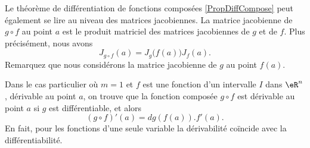 \begin{normaltext}      \label{NORMooKBJVooDDDmOa}
	Le théorème de différentiation de fonctions composées \ref{PropDiffCompose} peut également se lire au niveau des matrices jacobiennes. La matrice jacobienne de \( g\circ f\) au point \( a\) est le produit matriciel des matrices jacobiennes de \( g\) et de \( f\). Plus précisément, nous avons
	\begin{equation}
		J_{g\circ f}(a)=J_g\big( f(a) \big)J_f(a).
	\end{equation}
	Remarquez que nous considérons la matrice jacobienne de \( g\) au point \( f(a)\).

	Dans le cas particulier où \( m=1\) et \( f\) est une fonction d'un intervalle \( I\) dans \( \eR^n\), dérivable au point \( a\), on trouve que la fonction composée \( g\circ f\) est dérivable au point \( a\) si \( g\) est différentiable, et alors
	\[
		(g\circ f)'(a)= dg\left(f(a)\right).f'(a).
	\]
	En fait, pour les fonctions d'une seule variable la dérivabilité coïncide avec la différentiabilité.
\end{normaltext}
